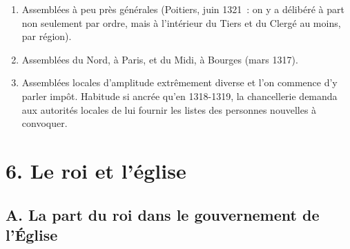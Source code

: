 \documentclass[french,twoside]{book} %
\newcommand\chapteropen{} %
\newcommand\chaptercont{} %
\newcommand\chapterclose{} %
\begin{document}
\begin{enumerate}[itemsep=0pt,]
\item Assemblées à peu près générales (Poitiers, juin 1321 : on y a délibéré à part non seulement par ordre, mais à l’intérieur du Tiers et du Clergé au moins, par région).
\item Assemblées du Nord, à Paris, et du Midi, à Bourges (mars 1317).
\item Assemblées locales d’amplitude extrêmement diverse et l’on commence d’y parler impôt. Habitude si ancrée qu’en 1318-1319, la chancellerie demanda aux autorités locales de lui fournir les listes des personnes nouvelles à convoquer.
\end{enumerate}

\chapterclose


\chapteropen
\chapter[{6. Le roi et l’église}]{\textsc{6. }Le roi et l’église}
\label{c06}\renewcommand{\leftmark}{\textsc{6. }Le roi et l’église}


\chaptercont
\section[{A. La part du roi dans le gouvernement de l’Église}]{A. La part du roi dans le gouvernement de l’Église}
\label{c06a}
\end{document}
